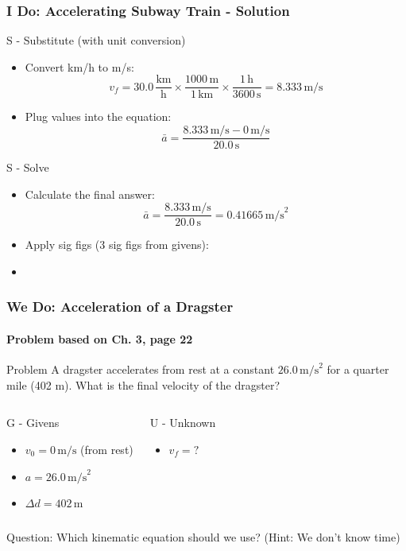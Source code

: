 \documentclass{beamer}
\begin{document}
\begin{frame}
\frametitle{I Do: Accelerating Subway Train - Solution}
\begin{block}{S - Substitute (with unit conversion)}
\begin{itemize}
    \item Convert km/h to m/s:
    \[ v_f = 30.0 \, \frac{\text{km}}{\text{h}} \times \frac{1000 \, \text{m}}{1 \, \text{km}} \times \frac{1 \, \text{h}}{3600 \, \text{s}} = 8.333 \, \text{m/s} \]
    \pause
    \item Plug values into the equation:
    \[ \bar{a} = \frac{8.333 \, \text{m/s} - 0 \, \text{m/s}}{20.0 \, \text{s}} \]
\end{itemize}
\end{block}
\pause
\begin{block}{S - Solve}
\begin{itemize}
    \item Calculate the final answer:
    \[ \bar{a} = \frac{8.333 \, \text{m/s}}{20.0 \, \text{s}} = 0.41665 \, \text{m/s}^2 \]
    \pause
    \item Apply sig figs (3 sig figs from givens):
    \item {}
\end{itemize}
\end{block}
\end{frame}

\begin{frame}
\frametitle{We Do: Acceleration of a Dragster}
\framesubtitle{Problem based on Ch. 3, page 22}
\begin{block}{Problem}
A dragster accelerates from rest at a constant $26.0 \, \text{m/s}^2$ for a quarter mile (402 m). What is the final velocity of the dragster?
\end{block}
\pause
\begin{columns}[T]
\begin{block}{G - Givens}
\begin{itemize}
    \item $v_0 = 0 \, \text{m/s}$ (from rest)
    \item $a = 26.0 \, \text{m/s}^2$
    \item $\Delta d = 402 \, \text{m}$
\end{itemize}
\end{block}
\pause
{}
\begin{block}{U - Unknown}
\begin{itemize}
    \item $v_f = ?$
\end{itemize}
\end{block}
\end{columns}
\pause
\begin{alertblock}{Question: Which kinematic equation should we use? (Hint: We don't know time)}
\end{alertblock}
\end{frame}
\end{document}
